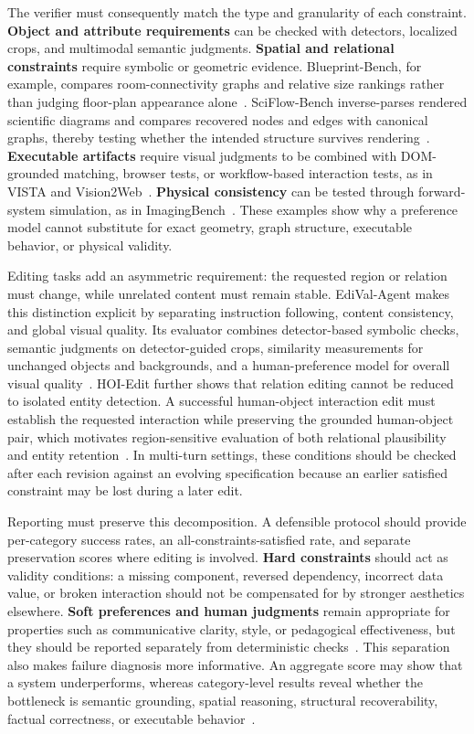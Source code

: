 The verifier must consequently match the type and granularity of each constraint. \textbf{Object and attribute requirements} can be checked with detectors, localized crops, and multimodal semantic judgments. \textbf{Spatial and relational constraints} require symbolic or geometric evidence. Blueprint-Bench, for example, compares room-connectivity graphs and relative size rankings rather than judging floor-plan appearance alone~\cite{avg250925229}. SciFlow-Bench inverse-parses rendered scientific diagrams and compares recovered nodes and edges with canonical graphs, thereby testing whether the intended structure survives rendering~\cite{avg260209809}. \textbf{Executable artifacts} require visual judgments to be combined with DOM-grounded matching, browser tests, or workflow-based interaction tests, as in VISTA and Vision2Web~\cite{avg260526144,avg260326648}. \textbf{Physical consistency} can be tested through forward-system simulation, as in ImagingBench~\cite{avg260707189}. These examples show why a preference model cannot substitute for exact geometry, graph structure, executable behavior, or physical validity.

Editing tasks add an asymmetric requirement: the requested region or relation must change, while unrelated content must remain stable. EdiVal-Agent makes this distinction explicit by separating instruction following, content consistency, and global visual quality. Its evaluator combines detector-based symbolic checks, semantic judgments on detector-guided crops, similarity measurements for unchanged objects and backgrounds, and a human-preference model for overall visual quality~\cite{avg250913399}. HOI-Edit further shows that relation editing cannot be reduced to isolated entity detection. A successful human-object interaction edit must establish the requested interaction while preserving the grounded human-object pair, which motivates region-sensitive evaluation of both relational plausibility and entity retention~\cite{avg260619073}. In multi-turn settings, these conditions should be checked after each revision against an evolving specification because an earlier satisfied constraint may be lost during a later edit.

Reporting must preserve this decomposition. A defensible protocol should provide per-category success rates, an all-constraints-satisfied rate, and separate preservation scores where editing is involved. \textbf{Hard constraints} should act as validity conditions: a missing component, reversed dependency, incorrect data value, or broken interaction should not be compensated for by stronger aesthetics elsewhere. \textbf{Soft preferences and human judgments} remain appropriate for properties such as communicative clarity, style, or pedagogical effectiveness, but they should be reported separately from deterministic checks~\cite{avg260329139,avg250516832}. This separation also makes failure diagnosis more informative. An aggregate score may show that a system underperforms, whereas category-level results reveal whether the bottleneck is semantic grounding, spatial reasoning, structural recoverability, factual correctness, or executable behavior~\cite{avg250913399,avg260526144,avg260209809}.

